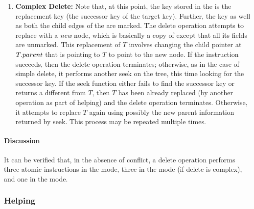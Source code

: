 \begin{limitscope}
\begin{enumerate}[leftmargin=*, label=(\alph*), noitemsep]
\item \textbf{Complex Delete:}
Note that, at this point, the key stored in the \targetnode{} is the replacement key (the successor key of the target key). Further, the key as well as both the child edges of the \targetnode{} are marked. The delete operation attempts to replace \targetnode{} with a \emph{new} node, which is basically a copy of \targetnode{} except that all its fields are unmarked. This replacement of $T$ involves changing the child pointer at $T.parent$ that is pointing to $T$ to point to the new node. If the \CAS{} instruction succeeds, then the delete operation terminates; otherwise, as in the case of simple delete, it performs another seek on the tree, this time looking for the successor key. If the seek function either fails to find the successor key or returns a \terminalnode{} different from $T$, then $T$ has been already replaced (by another operation as part of helping) and the delete operation terminates. Otherwise, it attempts to replace $T$ again using possibly the new parent information returned by seek. This process may be repeated multiple times.
\end{enumerate}

\paragraph*{Discussion}
It can be verified that, in the absence of conflict, a delete operation performs three atomic instructions in the \injection{} mode, three in the \discovery{} mode (if delete is complex), and one in the \cleanup{} mode. 

\begin{comment}


\subsubsection{Additional validation during seek}




During seek we maintain two seek records: current and previous seek records. This is to prevent the scenario shown in Fig.~\ref{fig:issueInSeek}.

\end{comment}

\subsubsection{Helping}


\end{limitscope}
